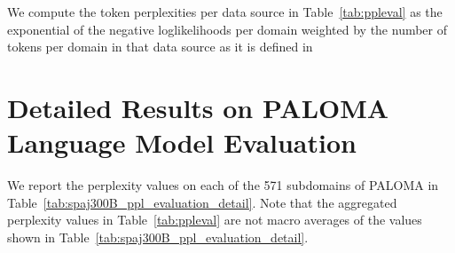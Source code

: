 \documentclass[dvipsnames]{article}
\begin{document}
\begin{appendix}
We compute the token perplexities per data source in Table~\ref{tab:ppleval} as the exponential of the negative loglikelihoods per domain weighted by the number of tokens per domain in that data source as it is defined in \citet[Equation~1]{Magnusson:23arxivshort}

\clearpage

\section{Detailed Results on PALOMA Language Model Evaluation}
\label{sec:paloma}

We report the perplexity values on each of the 571 subdomains of PALOMA in Table~\ref{tab:spaj300B_ppl_evaluation_detail}.
Note that the aggregated perplexity values in Table~\ref{tab:ppleval} are not macro averages of the values shown in Table~\ref{tab:spaj300B_ppl_evaluation_detail}.







\end{appendix}
\end{document}
